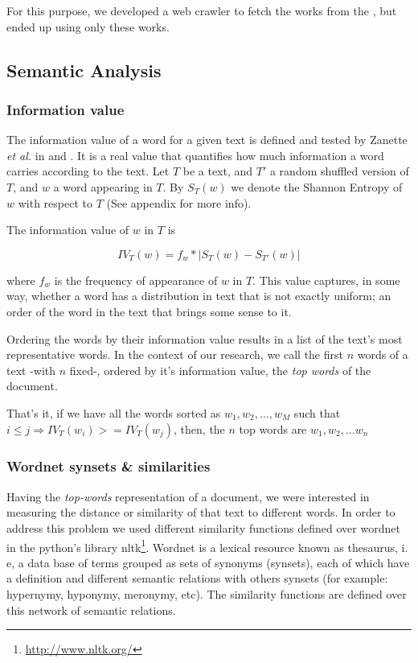 \documentclass{pnastwo}
\begin{document}
\begin{article}
For this purpose, we developed a web crawler to fetch the works from the \cite{LENIN}, but ended up using only these works.

\subsection{Semantic Analysis}
\medskip
\subsubsection{Information value}

The information value of a word for a given text is defined and tested by Zanette \textit{et al.} in \cite{DARWIN} and \cite{ENTROPIC}.
It is a real value that quantifies how much information a word carries according to the text. Let $T$ be a 
text, and $T'$ a random shuffled version of $T$, and $w$ a word appearing in $T$. 
By $S_T(w)$ we denote the Shannon Entropy of $w$ with respect to $T$ (See appendix for more info). 

The information value of $w$ in $T$ is 

\begin{equation}
  IV_T(w) = f_w* | S_T(w) - S_{T'}(w) | 
\end{equation}

where $f_w$ is the frequency of appearance of $w$ in $T$. This value captures, in some way, whether a word
has a distribution in text that is not exactly uniform; an order of the word in the text that brings some sense to it. 


Ordering the words by their information value results in a list of the text's most representative words. In the context of our research, we call the first $n$ words of a text -with $n$ fixed-, ordered by it's information value, the \textit{top words} of the document. 

That's it, if we have all the words sorted as $w_1, w_2, \ldots , w_M$ such that $ i \leq j \Rightarrow IV_{T}(w_i) >= IV_{T}(w_j)$, then, the $n$ top words are $w_1, w_2, \ldots w_n$

\subsubsection{Wordnet synsets \& similarities}

Having the \textit{top-words} representation of a document, we were interested in measuring the distance or similarity of that text to different words. In order to address this problem we used different similarity functions defined over wordnet in the python's library nltk\footnote{\url{http://www.nltk.org/}}. Wordnet is a lexical resource known as thesaurus, i. e, a data base of terms grouped as sets of synonyms (synsets), each of which have a definition and different semantic relations with others synsets (for example: hypernymy, hyponymy, meronymy, etc). The similarity functions are defined over this network of semantic relations.


\end{article}
\end{document}

